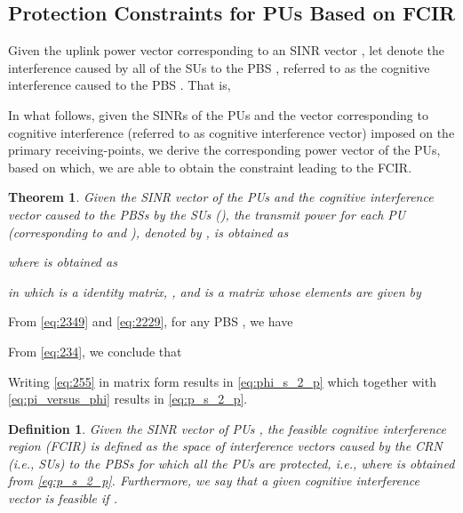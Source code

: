 \documentclass[journal,twoside]{IEEEtran}
\newtheorem {theorem}{Theorem}
\newtheorem {definition}{Definition}
\begin{document}
\subsection{Protection Constraints for PUs Based on FCIR}

	
	Given the uplink power vector  corresponding to an SINR vector , let  denote the interference caused by all of the SUs to the PBS , referred to as the cognitive interference caused to the PBS . That is, 




	


	In what follows, given the SINRs of the PUs and the vector corresponding to cognitive interference (referred to as cognitive interference vector) imposed on the primary receiving-points, we derive the corresponding power vector of the PUs, based on which, we are able to obtain the constraint leading to the FCIR.
	\begin{theorem} 
		Given the SINR vector of the PUs  and the cognitive interference vector caused to the PBSs by the SUs (), the transmit power for each PU  (corresponding to   and ), denoted by , is obtained as 
		
		where  is obtained as
		
		in which  is a  identity matrix, , and  is a  matrix whose elements are given by
		
	\end{theorem}
	\begin{IEEEproof}
		From \eqref{eq:2349} and \eqref{eq:2229}, for any PBS , we have
		
		From \eqref{eq:234}, we conclude that
		
		Writing \eqref{eq:255} in matrix form results in \eqref{eq:phi_s_2_p} which together with \eqref{eq:pi_versus_phi} results in \eqref{eq:p_s_2_p}.
	\end{IEEEproof}
	\begin{definition}
	\label{def:feasible_interference}
		Given the SINR vector of PUs , the feasible cognitive interference region (FCIR)  is defined as the space of interference vectors caused by the CRN (i.e., SUs) to the PBSs for which all the PUs are protected, i.e., 
		where  is obtained from \eqref{eq:p_s_2_p}. Furthermore, we say that a given cognitive interference vector  is feasible if .
	\end{definition}
	
\end{document}
